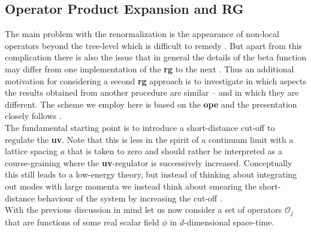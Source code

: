 \documentclass[english, parskip=full]{scrartcl}
\renewcommand{\gls}[1]{\textbf{#1}}
\begin{document}
\subsection{Operator Product Expansion and RG}\label{sec:rg:ope_and_rg}
The main problem with the \tms{} renormalization is the appearance of non-local operators beyond the tree-level which is difficult to remedy \cite{RG_Wilson_SmoothCutoff_Nozieres_1987}.
But apart from this complication there is also the issue that in general the details of the beta function may differ from one implementation of the \gls{rg} to the next \cite[\sapp E]{Giamarchi_2004}.
Thus an additional motivation for considering a second \gls{rg} approach is to investigate in which aspects the results obtained from another procedure are similar -- and in which they are different.
The scheme we employ here is based on the \gls{ope} and the presentation closely follows \cites[]{Cardy_1996}[]{Fradkin_2013}. \\ %
The fundamental starting point is to introduce a short-distance cut-off to regulate the \gls{uv}.
Note that this is less in the spirit of a continuum limit with a lattice spacing $a$ that is taken to zero and should rather be interpreted as a course-graining where the \gls{uv}-regulator is successively increased.
Conceptually this still leads to a low-energy theory, but instead of thinking about integrating out modes with large momenta we instead think about smearing the short-distance behaviour of the system by increasing the cut-off \cite[]{Fradkin_2013}. \\ %
With the previous discussion in mind let us now consider a set of operators $\mathcal{O}_j$ that are functions of some real scalar field $\phi$ in $d$-dimensional space-time.
\end{document}
